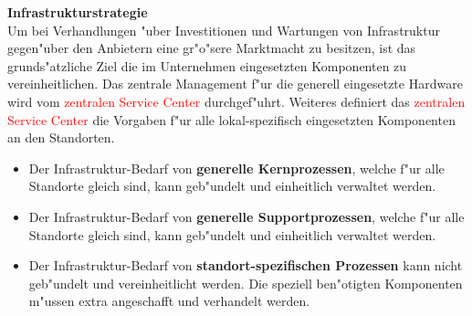 \textbf{Infrastrukturstrategie}\\
Um bei Verhandlungen "uber Investitionen und Wartungen von Infrastruktur gegen"uber den Anbietern eine gr"o"sere Marktmacht zu besitzen, ist das grunds"atzliche Ziel die im Unternehmen eingesetzten Komponenten zu vereinheitlichen. Das zentrale Management f"ur die generell eingesetzte Hardware wird vom \textcolor{red}{zentralen Service Center} durchgef"uhrt. Weiteres definiert das \textcolor{red}{zentralen Service Center} die Vorgaben f"ur alle lokal-spezifisch eingesetzten Komponenten an den Standorten.

\begin{itemize}

	\item Der Infrastruktur-Bedarf von \textbf{generelle Kernprozessen}, welche f"ur alle Standorte gleich sind, kann geb"undelt und einheitlich verwaltet werden. 

	\item Der Infrastruktur-Bedarf von \textbf{generelle Supportprozessen}, welche f"ur alle Standorte gleich sind, kann geb"undelt und einheitlich verwaltet werden. 

	\item Der Infrastruktur-Bedarf von \textbf{standort-spezifischen Prozessen} kann nicht geb"undelt und vereinheitlicht werden. Die speziell ben"otigten Komponenten m"ussen extra angeschafft und verhandelt werden.

\end{itemize}


